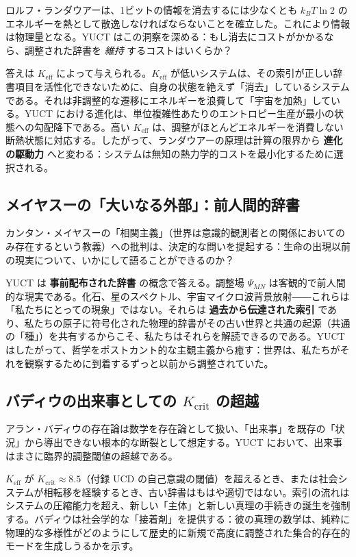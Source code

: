\documentclass[12pt,a4paper]{article}
\newcommand{\Keff}{K_{\mathrm{eff}}}
\begin{document}
	ロルフ・ランダウアーは、1ビットの情報を消去するには少なくとも \(k_B T \ln 2\) のエネルギーを熱として散逸しなければならないことを確立した。これにより情報は物理量となる。YUCT はこの洞察を深める：もし消去にコストがかかるなら、調整された辞書を \emph{維持} するコストはいくらか？
	
	答えは \(\Keff\) によって与えられる。\(\Keff\) が低いシステムは、その索引が正しい辞書項目を活性化できないために、自身の状態を絶えず「消去」しているシステムである。それは非調整的な遷移にエネルギーを浪費して「宇宙を加熱」している。YUCT における進化は、単位複雑性あたりのエントロピー生産が最小の状態への勾配降下である。高い \(\Keff\) は、調整がほとんどエネルギーを消費しない断熱状態に対応する。したがって、ランダウアーの原理は計算の限界から \textbf{進化の駆動力} へと変わる：システムは無知の熱力学的コストを最小化するために選択される。
	
	\subsection{メイヤスーの「大いなる外部」：前人間的辞書}
	
	カンタン・メイヤスーの「相関主義」（世界は意識的観測者との関係においてのみ存在するという教義）への批判は、決定的な問いを提起する：生命の出現以前の現実について、いかにして語ることができるのか？
	
	YUCT は \textbf{事前配布された辞書} の概念で答える。調整場 \(\Psi_{MN}\) は客観的で前人間的な現実である。化石、星のスペクトル、宇宙マイクロ波背景放射――これらは「私たちにとっての現象」ではない。それらは \textbf{過去から伝達された索引} であり、私たちの原子に符号化された物理的辞書がその古い世界と共通の起源（共通の「種」）を共有するからこそ、私たちはそれらを解読できるのである。YUCT はしたがって、哲学をポストカント的な主観主義から癒す：世界は、私たちがそれを観察するために到着するずっと以前から調整されていた。
	
	\subsection{バディウの出来事としての \(K_{\mathrm{crit}}\) の超越}
	
	アラン・バディウの存在論は数学を存在論として扱い、「出来事」を既存の「状況」から導出できない根本的な断裂として想定する。YUCT において、出来事はまさに臨界的調整閾値の超越である。
	
	\(\Keff\) が \(K_{\mathrm{crit}} \approx 8.5\)（付録 UCD の自己意識の閾値）を超えるとき、または社会システムが相転移を経験するとき、古い辞書はもはや適切ではない。索引の流れはシステムの圧縮能力を超え、新しい「主体」と新しい真理の手続きの誕生を強制する。バディウは社会学的な「接着剤」を提供する：彼の真理の数学は、純粋に物理的な多様性がどのようにして歴史的に新規で高度に調整された集合的存在的モードを生成しうるかを示す。
	
\end{document}
